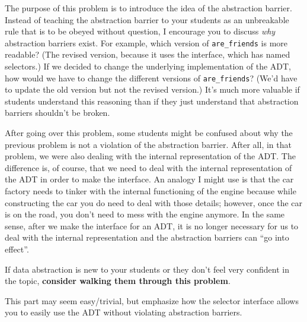     \begin{questionmeta}
    The purpose of this problem is to introduce the idea of the abstraction barrier. Instead of teaching the abstraction barrier
    to your students as an unbreakable rule that is to be obeyed without question, I encourage you to discuss \textit{why} abstraction
    barriers exist. For example, which version of \lstinline{are_friends} is more readable? (The revised version, because it uses the interface,
    which has named selectors.) If we decided to change the underlying implementation of the ADT, how would we have to change the different
    versions of \lstinline{are_friends}? (We'd have to update the old version but not the revised version.) It's much more valuable if 
    students understand this reasoning than if they just understand that abstraction barriers shouldn't be broken. 
    
    After going over this problem, some students might be confused about why the previous problem is not a violation of the abstraction 
    barrier. After all, in that problem, we were also dealing with the internal representation of the ADT. The difference is, of course,
    that we need to deal with the internal representation of the ADT in order to make the interface. An analogy I might use is that the
    car factory needs to tinker with the internal functioning of the engine because while constructing the car you do need to deal with 
    those details; however, once the car is on the road, you don't need to mess with the engine anymore. In the same sense, after we make
    the interface for an ADT, it is no longer necessary for us to deal with the internal representation and the abstraction barriers can
    ``go into effect''. 

    If data abstraction is new to your students or they don't feel very confident in the topic, \textbf{consider walking them through this problem}.

    This part may seem easy/trivial, but emphasize how the selector interface allows you to easily use the ADT without violating abstraction barriers.
    \end{questionmeta}

